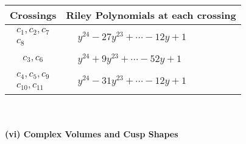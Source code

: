 \documentclass[1p]{elsarticle_modified}
\theoremstyle{definition}
\begin{document}
\begin{tabular}{m{50pt}|m{274pt}}
Crossings & \hspace{64pt}Riley Polynomials at each crossing \\
\hline $$\begin{aligned}c_{1},c_{2},c_{7}\\c_{8}\end{aligned}$$&$\begin{aligned}
&y^{24}-27 y^{23}+\cdots-12 y+1
\end{aligned}$\\
\hline $$\begin{aligned}c_{3},c_{6}\end{aligned}$$&$\begin{aligned}
&y^{24}+9 y^{23}+\cdots-52 y+1
\end{aligned}$\\
\hline $$\begin{aligned}c_{4},c_{5},c_{9}\\c_{10},c_{11}\end{aligned}$$&$\begin{aligned}
&y^{24}-31 y^{23}+\cdots-12 y+1
\end{aligned}$\\
\hline
\end{tabular}\\~\\
\newpage\flushleft \textbf{(vi) Complex Volumes and Cusp Shapes}
\end{document}
